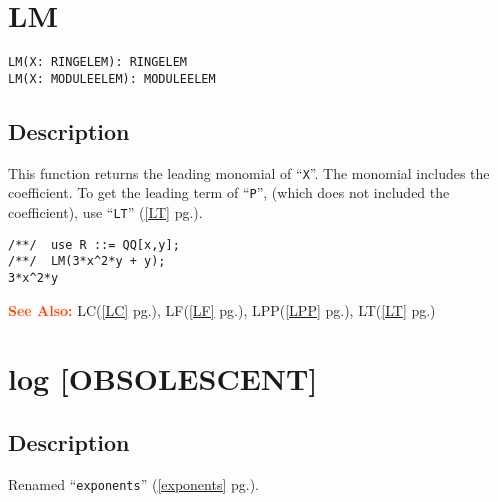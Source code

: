 \documentclass[a4paper]{mybook}
\newenvironment{command}{}{} %
\newcommand\SeeAlso{\par\textcolor{OrangeRed}{\textbf{\large See Also: }}}
\begin{document}
\section{LM}
\label{LM}
\begin{command} %


\begin{Verbatim}[label=syntax, rulecolor=\color{MidnightBlue},
frame=single]
LM(X: RINGELEM): RINGELEM
LM(X: MODULEELEM): MODULEELEM
\end{Verbatim}


\subsection*{Description}

This function returns the leading monomial of ``\verb&X&''.  The monomial
includes the coefficient.  To get the leading term of ``\verb&P&'', (which does
not included the coefficient), use ``\verb&LT&'' (\ref{LT} pg.\pageref{LT}).
\begin{Verbatim}[label=example, rulecolor=\color{PineGreen}, frame=single]
/**/  use R ::= QQ[x,y];
/**/  LM(3*x^2*y + y);
3*x^2*y
\end{Verbatim}


\SeeAlso %
  LC(\ref{LC} pg.\pageref{LC}), 
    LF(\ref{LF} pg.\pageref{LF}), 
    LPP(\ref{LPP} pg.\pageref{LPP}), 
    LT(\ref{LT} pg.\pageref{LT})
\end{command} %

\section{log [OBSOLESCENT]}
\label{log [OBSOLESCENT]}
\begin{command} %



\subsection*{Description}

Renamed ``\verb&exponents&'' (\ref{exponents} pg.\pageref{exponents}).

\end{command} %
\end{document}

